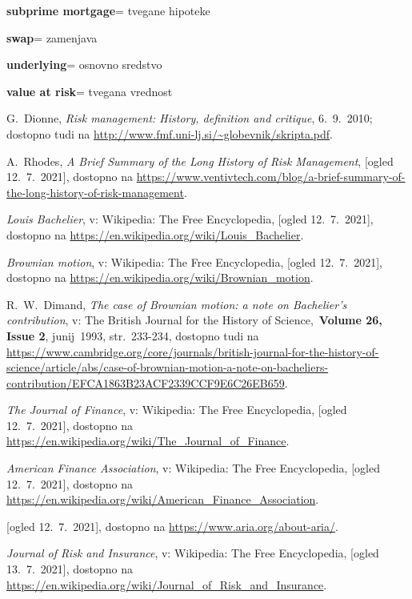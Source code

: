 \documentclass[12pt,a4paper]{amsart}
\theoremstyle{definition} %
\theoremstyle{plain} %
\newcommand{\geslo}[2]{\noindent\textbf{#1}\hspace*{3mm}\hangindent=\parindent\hangafter=1 #2}
\begin{document}
\geslo{subprime mortgage}{tvegane hipoteke}

\geslo{swap}{zamenjava}

\geslo{underlying}{osnovno sredstvo}

\geslo{value at risk}{tvegana vrednost}


\begin{thebibliography}{99}

G.~Dionne, \emph{Risk management: History, definition and critique}, 6.~9.~2010; dostopno tudi na
\url{http://www.fmf.uni-lj.si/~globevnik/skripta.pdf}.

A.~Rhodes, \emph{A Brief Summary of the Long History of Risk Management}, [ogled 12.~7.~2021], dostopno na \url{
https://www.ventivtech.com/blog/a-brief-summary-of-the-long-history-of-risk-management}.

\emph{Louis Bachelier}, v: Wikipedia: The Free Encyclopedia, [ogled 12.~7.~2021], dostopno na \url{https://en.wikipedia.org/wiki/Louis_Bachelier}.

\emph{Brownian motion}, v: Wikipedia: The Free Encyclopedia, [ogled 12.~7.~2021], dostopno na \url{https://en.wikipedia.org/wiki/Brownian_motion}.

R.~W.~Dimand, \emph{The case of Brownian motion: a note on Bachelier's contribution}, v: The British Journal for the History of Science,\ \textbf{Volume 26, Issue 2}, junij\ 1993, str.\ 233-234, dostopno tudi na \url{https://www.cambridge.org/core/journals/british-journal-for-the-history-of-science/article/abs/case-of-brownian-motion-a-note-on-bacheliers-contribution/EFCA1863B23ACF2339CCF9E6C26EB659}.

\emph{The Journal of Finance}, v: Wikipedia: The Free Encyclopedia, [ogled 12.~7.~2021], dostopno na \url{https://en.wikipedia.org/wiki/The_Journal_of_Finance}.

\emph{American Finance Association}, v: Wikipedia: The Free Encyclopedia, [ogled 12.~7.~2021], dostopno na \url{https://en.wikipedia.org/wiki/American_Finance_Association}.

[ogled 12.~7.~2021], dostopno na \url{https://www.aria.org/about-aria/}.

\emph{Journal of Risk and Insurance}, v: Wikipedia: The Free Encyclopedia, [ogled 13.~7.~2021], dostopno na \url{https://en.wikipedia.org/wiki/Journal_of_Risk_and_Insurance}.


\end{thebibliography}
\end{document}

